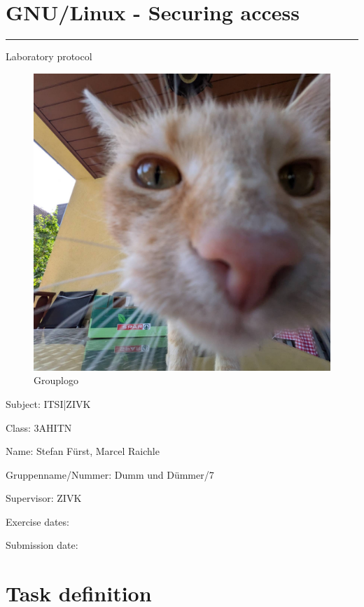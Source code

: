 \documentclass[a4paper]{article}
\begin{document}

\pagestyle{oida}
\section*{GNU/Linux - Securing access}
\par\noindent\rule{\textwidth}{0.4pt}

Laboratory protocol

\begin{figure}[h]
	\includegraphics[scale=0.3]{images/mika.jpeg}
	\caption{Grouplogo}
\end{figure}

\vspace*{\fill}
Subject:	ITSI|ZIVK

Class:	3AHITN

Name:	Stefan Fürst, Marcel Raichle

Gruppenname/Nummer: Dumm und Dümmer/7

Supervisor: 	ZIVK

Exercise dates:

Submission date:


\newpage
\tableofcontents

\newpage

\section{Task definition}
\end{document}
